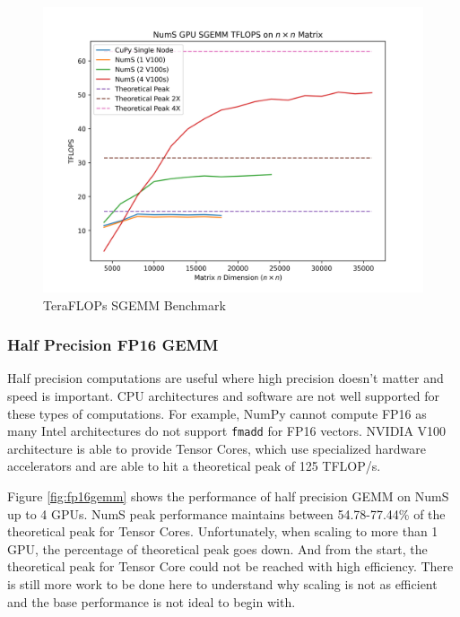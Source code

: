 \documentclass{article}
\begin{document}
\begin{figure}
  \centerline{\includegraphics[width=5in]{figures/NumS_GPU_TFLOPS_SGEMM.png}}
  \caption{TeraFLOPs SGEMM Benchmark}
  \label{fig:sgemm}
\end{figure}

\subsubsection{Half Precision FP16 GEMM}
Half precision computations are useful where high precision doesn't matter and speed is important. CPU architectures and software are not well supported for these types of computations. For example, NumPy cannot compute FP16 as many Intel architectures do not support \verb|fmadd| for FP16 vectors. NVIDIA V100 architecture is able to provide Tensor Cores, which use specialized hardware accelerators and are able to hit a theoretical peak of 125 TFLOP/s.

Figure \ref{fig:fp16gemm} shows the performance of half precision GEMM on NumS up to 4 GPUs. NumS peak performance maintains between 54.78-77.44\% of the theoretical peak for Tensor Cores. Unfortunately, when scaling to more than 1 GPU, the percentage of theoretical peak goes down. And from the start, the theoretical peak for Tensor Core could not be reached with high efficiency. There is still more work to be done here to understand why scaling is not as efficient and the base performance is not ideal to begin with.
\end{document}
